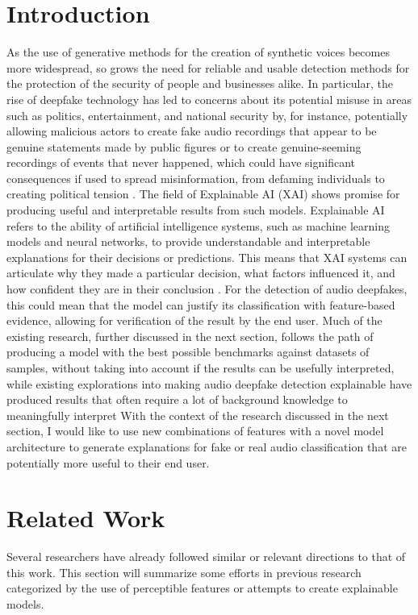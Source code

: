 \documentclass{article}
\begin{document}
    \section{Introduction}
    As the use of generative methods for the creation of synthetic voices becomes more widespread,
    so grows the need for reliable and usable detection methods for the protection of the security
    of people and businesses alike. In particular, the rise of deepfake technology has led to
	concerns about its potential misuse in areas such as politics, entertainment, and national
	security by, for instance, potentially allowing malicious actors to create fake audio
	recordings that appear to be genuine statements made by public figures or to create
	genuine-seeming recordings of events that never happened, which could have significant
	consequences if used to spread misinformation, from defaming individuals to creating political
	tension \cite{veerasamy_rising_2022,albahar_deepfakes_2005}. The field of Explainable AI (XAI)
	shows promise for producing useful and interpretable results from such models. Explainable AI
	refers to the ability of artificial intelligence systems, such as machine learning models and
	neural networks, to provide understandable and interpretable explanations for their decisions
	or predictions. This means that XAI systems can articulate why they made a particular
	decision, what factors influenced it, and how confident they are in their conclusion
	\cite{hind_explaining_2019}. For the detection of audio deepfakes, this could mean that the
	model can justify its classification with feature-based evidence, allowing for verification of
	the result by the end user. Much of the existing research, further discussed in the next
	section, follows the path of producing a model with the best possible benchmarks against
	datasets of samples, without taking into account if the results can be usefully interpreted,
	while existing explorations into making audio deepfake detection explainable have produced
	results that often require a lot of background knowledge to meaningfully interpret With the
	context of the research discussed in the next section, I would like to use new combinations of
	features with a novel model architecture to generate explanations for fake or real audio
	classification that are potentially more useful to their end user.
	\section{Related Work}
	Several researchers have already followed similar or relevant directions to that of this work.
	This section will summarize some efforts in previous research categorized by the use of
	perceptible features or attempts to create explainable models.
\end{document}
